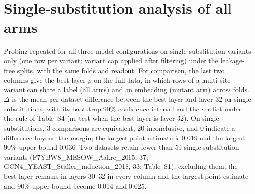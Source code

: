 \documentclass[11pt,a4paper]{article}
\begin{document}
\section*{Single-substitution analysis of all arms}
Probing repeated for all three model configurations on single-substitution variants only
(one row per variant; variant cap applied after filtering) under the leakage-free splits,
with the same folds and readout. For comparison, the last two columns give the best-layer
$\rho$ on the full data, in which rows of a multi-site variant can share a label (all
arms) and an embedding (mutant arm) across folds. $\Delta$ is the mean per-dataset
difference between the best layer and layer 32 on single substitutions, with its
bootstrap 90\% confidence interval and the verdict under the rule of Table~S4 (no test
when the best layer is layer 32). On single substitutions, 3 comparisons are equivalent,
20 inconclusive, and 0 indicate a difference beyond the margin; the largest point
estimate is 0.019 and the largest 90\% upper bound 0.036. Two datasets retain fewer than 50
single-substitution variants (F7YBW8\_MESOW\_Aakre\_2015, 37; GCN4\_YEAST\_Staller\_induction\_2018,
33; Table~S1); excluding them, the best layer remains in layers 30--32 in every column and the
largest point estimate and 90\% upper bound become 0.014 and 0.025.
\end{document}
